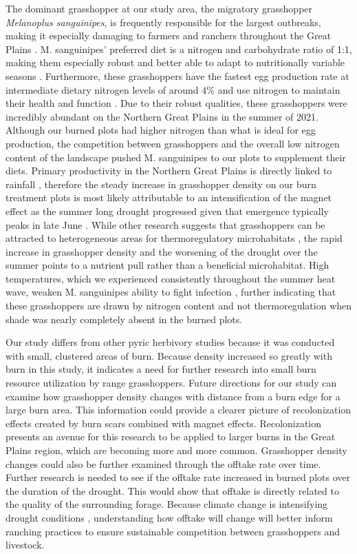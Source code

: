 \documentclass[referee, 
	            sn-basic]
           {sn-jnl}
\begin{document}
\begin{linenumbers}
The dominant grasshopper at our study area, the migratory grasshopper \emph{Melanoplus sanguinipes}, is frequently responsible for the largest outbreaks, making it especially damaging to farmers and ranchers throughout the Great Plains \citep{onsager2000, olfert2021}.
M. sanguinipes' preferred diet is a nitrogen and carbohydrate ratio of
1:1, making them especially robust and better able to adapt to
nutritionally variable seasons \citep{behmer2008}. Furthermore, these
grasshoppers have the fastest egg production rate at intermediate
dietary nitrogen levels of around 4\% \citep{joern1998} and use nitrogen
to maintain their health and function \citep{schmitz2010}. Due to their
robust qualities, these grasshoppers were incredibly abundant on the
Northern Great Plains in the summer of 2021. Although our burned plots
had higher nitrogen than what is ideal for egg production, the
competition between grasshoppers and the overall low nitrogen content of
the landscape pushed M. sanguinipes to our plots to supplement their
diets. Primary productivity in the Northern Great Plains is directly
linked to rainfall \citep{padbury2002}, therefore the steady increase in
grasshopper density on our burn treatment plots is most likely
attributable to an intensification of the magnet effect as the summer
long drought progressed given that emergence typically peaks in late
June \citep{belovsky1995, humphreys2022}. While other research suggests
that grasshoppers can be attracted to heterogeneous areas for
thermoregulatory microhabitats \citep{joern2013}, the rapid increase in
grasshopper density and the worsening of the drought over the summer
points to a nutrient pull rather than a beneficial microhabitat. High
temperatures, which we experienced consistently throughout the summer
heat wave, weaken M. sanguinipes ability to fight infection
\citep{srygley2022}, further indicating that these grasshoppers are
drawn by nitrogen content and not thermoregulation when shade was nearly
completely absent in the burned plots.

Our study differs from other pyric herbivory studies because it was
conducted with small, clustered areas of burn. Because density increased
so greatly with burn in this study, it indicates a need for further
research into small burn resource utilization by range grasshoppers.
Future directions for our study can examine how grasshopper density
changes with distance from a burn edge for a large burn area. This
information could provide a clearer picture of recolonization effects
created by burn scars combined with magnet effects. Recolonization
presents an avenue for this research to be applied to larger burns in
the Great Plains region, which are becoming more and more common.
Grasshopper density changes could also be further examined through the
offtake rate over time. Further research is needed to see if the offtake
rate increased in burned plots over the duration of the drought. This
would show that offtake is directly related to the quality of the
surrounding forage. Because climate change is intensifying drought
conditions \citep{derner2018}, understanding how offtake will change
will better inform ranching practices to ensure sustainable competition
between grasshoppers and livestock.


\end{linenumbers}
\end{document}
